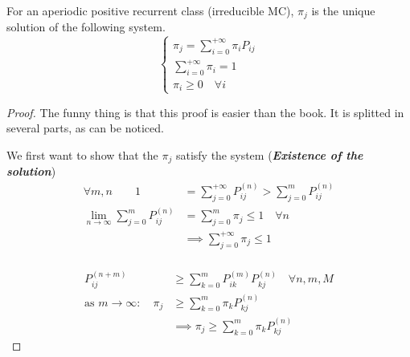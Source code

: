 	\begin{theorem}[1.3 (K.T. pp 85-86)]
		For an aperiodic positive recurrent class (irreducible MC), $\pi_j$ is the unique solution of the following system.
		\begin{equation*}\begin{cases}
			\pi_j = \sum\limits_{i=0}^{+\infty} \pi_i P_{ij} \\
			\sum\limits_{i=0}^{+\infty} \pi_i = 1 \\
			\pi_i \geq 0 \quad \forall i
		\end{cases}\end{equation*}
	\end{theorem}

	\begin{proof} The funny thing is that this proof is easier than the book.
		It is splitted in several parts, as can be noticed.

		\proofpart
			We first want to show that the $\pi_j$ satisfy the system (\textbf{\textit{Existence of the solution}})
			\begin{equation*}
				\begin{split}
					\forall m,n \qquad 1&=\sum\limits_{j=0}^{+\infty} P_{ij}^{(n)} > \sum\limits_{j=0}^m P_{ij}^{(n)}\\
	 			 \lim_{n\to\infty} \sum\limits_{j=0}^m P_{ij}^{(n)} &= \sum\limits_{j=0}^m \pi_j \leq 1 \quad \forall n \\
				 &\implies \sum\limits_{j=0}^{+\infty} \pi_j \leq 1\\
				\end{split}
			\end{equation*}

		\proofpart
			\begin{equation*}
				\begin{split}
					P_{ij}^{(n+m)} &\geq \sum\limits_{k=0}^m P_{ik}^{(m)} P_{kj}^{(n)} \quad \forall n, m, M\\
					\text{as } m \to \infty :\quad \pi_j &\geq \sum\limits_{k=0}^m \pi_k P_{kj}^{(n)}\\
					&\implies  \pi_j \geq \sum\limits_{k=0}^m \pi_k P_{kj}^{(n)}
				\end{split}
			\end{equation*}


\end{proof}
